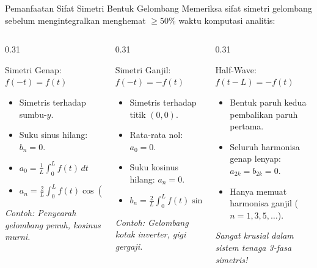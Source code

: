 \documentclass[aspectratio=169,10pt]{beamer}
\begin{document}
\begin{frame}{Pemanfaatan Sifat Simetri Bentuk Gelombang}
  Memeriksa sifat simetri gelombang sebelum mengintegralkan menghemat $\ge 50\%$ waktu komputasi analitis:
  \vspace{0.1cm}
  \begin{columns}[t]
    \begin{column}{0.31\textwidth}
      \begin{block}{Simetri Genap: $f(-t) = f(t)$}
        \small
        \begin{itemize}
          \item Simetris terhadap sumbu-$y$.
          \item Suku sinus hilang: $b_n = 0$.
          \item $a_0 = \frac{1}{L} \int_{0}^{L} f(t) \, dt$
          \item $a_n = \frac{2}{L} \int_{0}^{L} f(t) \cos\left(\frac{n\pi t}{L}\right) dt$
        \end{itemize}
        \textit{Contoh: Penyearah gelombang penuh, kosinus murni.}
      \end{block}
    \end{column}
    \begin{column}{0.31\textwidth}
      \begin{alertblock}{Simetri Ganjil: $f(-t) = -f(t)$}
        \small
        \begin{itemize}
          \item Simetris terhadap titik $(0,0)$.
          \item Rata-rata nol: $a_0 = 0$.
          \item Suku kosinus hilang: $a_n = 0$.
          \item $b_n = \frac{2}{L} \int_{0}^{L} f(t) \sin\left(\frac{n\pi t}{L}\right) dt$
        \end{itemize}
        \textit{Contoh: Gelombang kotak inverter, gigi gergaji.}
      \end{alertblock}
    \end{column}
    \begin{column}{0.31\textwidth}
      \begin{exampleblock}{Half-Wave: $f(t - L) = -f(t)$}
        \small
        \begin{itemize}
          \item Bentuk paruh kedua pembalikan paruh pertama.
          \item Seluruh harmonisa genap lenyap: $a_{2k} = b_{2k} = 0$.
          \item Hanya memuat harmonisa ganjil ($n = 1, 3, 5, \dots$).
        \end{itemize}
        \textit{Sangat krusial dalam sistem tenaga 3-fasa simetris!}
      \end{exampleblock}
    \end{column}
  \end{columns}
\end{frame}
\end{document}
